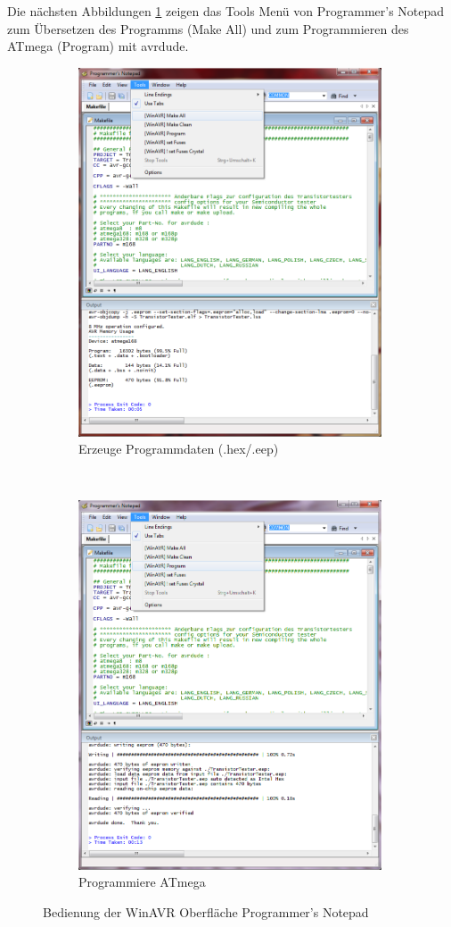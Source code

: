 Die nächsten Abbildungen \ref{fig:WinAVR2} zeigen das Tools Menü von Programmer's Notepad
zum Übersetzen des Programms (Make All) und zum Programmieren des ATmega (Program) mit avrdude.

\begin{figure}[H]
  \begin{subfigure}[b]{9cm}
    \centering
    \includegraphics[width=9cm]{../PNG/Notepad_make.png}
    \caption{Erzeuge Programmdaten (.hex/.eep)}
  \end{subfigure}
  ~
  \begin{subfigure}[b]{9cm}
    \centering
    \includegraphics[width=9cm]{../PNG/Notepad_program.png}
    \caption{Programmiere ATmega}
  \end{subfigure}
  \caption{Bedienung der WinAVR Oberfläche Programmer's Notepad}
  \label{fig:WinAVR2}
\end{figure}


